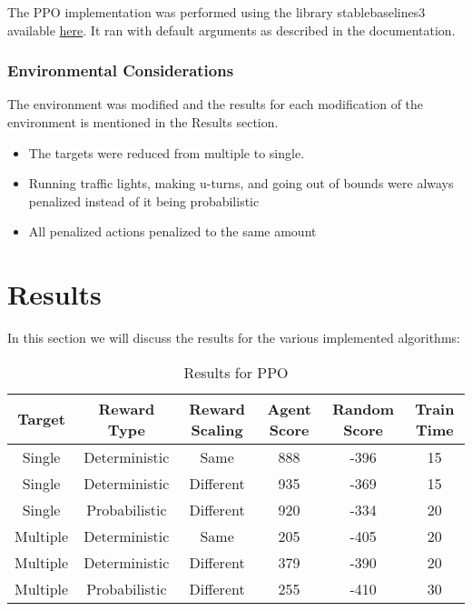 \documentclass{article}
\begin{document}
The PPO implementation was performed using the library stable\textunderscore baselines3 available  \href{https://stable-baselines3.readthedocs.io/en/master/}{here}. It ran with default arguments as described in the documentation.

\subsubsection{Environmental Considerations}
\label{considerations}
The environment was modified and the results for each modification of the environment is mentioned in the Results section.
\begin{itemize}
	\item The targets were reduced from multiple to single. 
	\item Running traffic lights, making u-turns, and going out of bounds were always penalized instead of it being probabilistic
	\item All penalized actions penalized to the same amount
\end{itemize}

\section{Results}
In this section we will discuss the results for the various implemented algorithms:

\begin{table*}[h]
	\centering
	\caption[]{Results for PPO}\label{Results for PPO}%
	\begin{tabular}{cccccc}
		\toprule
		Target & Reward Type & Reward Scaling\footnotemark[1] & Agent Score\footnotemark[2] & Random Score\footnotemark[2] & Train Time\footnotemark[3]\\
		\midrule
		Single &  Deterministic & Same & 888 & -396 & 15\\
		Single & Deterministic & Different\footnotemark[4] & 935 & -369 & 15\\
		Single & Probabilistic & Different & 920 & -334 & 20\\
		\midrule
		Multiple & Deterministic & Same & 205 & -405 & 20\\
		Multiple & Deterministic & Different & 379 & -390 & 20\\
		Multiple & Probabilistic & Different & 255 & -410 & 30\\
		\bottomrule
	\end{tabular}
	\label{tab: PPO_Table}
\end{table*}
\end{document}
